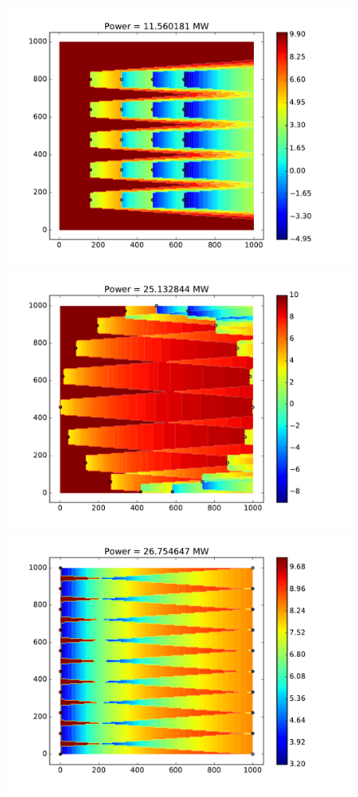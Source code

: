 \documentclass{article}
\begin{document}
\begin{figure}[htb!]
\includegraphics[scale=.25]{grid}
\includegraphics[scale=.25]{circle}
\includegraphics[scale=.25]{edges}
\end{figure}
\end{document}
